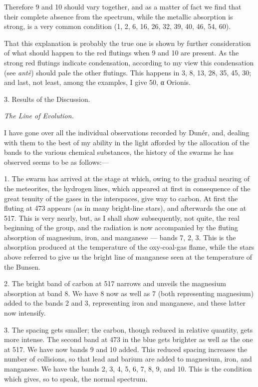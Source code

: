 \documentclass[a4paper, 12pt, oneside, polutonikogreek, english]{article}
\begin{document}
Therefore 9 and 10 should vary together, and as a matter of fact we find that their complete absence from the spectrum, while the metallic absorption is strong, is a very common condition (1, 2, 6, 16, 26, 32, 39, 40, 46, 54, 60).

That this explanation is probably the true one is shown by further consideration of what should happen to the red flutings when 9 and 10 are present. As the strong red flutings indicate condensation, according to my view this condensation (see \emph{antè}) should pale the other flutings. This happens in 3, 8, 13, 28, 35, 45, 30; and last, not least, among the examples, I give 50, α Orionis.

3. Results of the Discussion.

\emph{The Line of Evolution.}

I have gone over all the individual observations recorded by Dunér, and, dealing with them to the best of my ability in the light afforded by the allocation of the bands to the various chemical substances, the history of the swarms he has observed seems to be as follows:---

1. The swarm has arrived at the stage at which, owing to the gradual nearing of the meteorites, the hydrogen lines, which appeared at first in consequence of the great tenuity of the gases in the interspaces, give way to carbon. At first the fluting at 473 appears (as in many bright-line stars), and afterwards the one at 517. This is very nearly, but, as I shall show subsequently, not quite, the real beginning of the group, and the radiation is now accompanied by the fluting absorption of magnesium, iron, and manganese --- bands 7, 2, 3. This is the absorption produced at the temperature of the oxy-coal-gas flame, while the stars above referred to give us the bright line of manganese seen at the temperature of the Bunsen.

2. The bright band of carbon at 517 narrows and unveils the magnesium absorption at band 8. We have 8 now as well as 7 (both representing magnesium) added to the bands 2 and 3, representing iron and manganese, and these latter now intensify.

3. The spacing gets smaller; the carbon, though reduced in relative quantity, gets more intense. The second band at 473 in the blue gets brighter as well as the one at 517. We have now bands 9 and 10 added. This reduced spacing increases the number of collisions, so that lead and barium are added to magnesium, iron, and manganese. We have the bands 2, 3, 4, 5, 6, 7, 8, 9, and 10. This is the condition which gives, so to speak, the normal spectrum.
\end{document}
